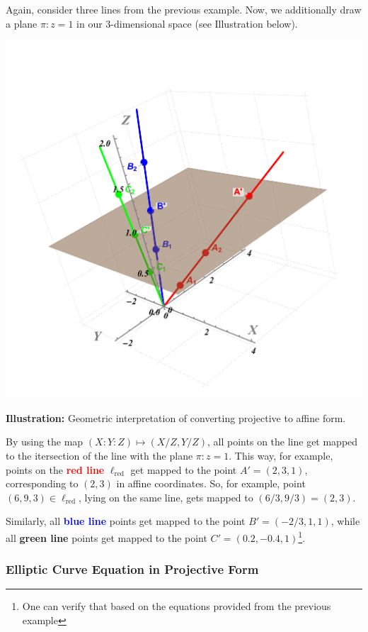 \documentclass[../lecture-notes-148x210.tex]{subfiles}
\begin{document}
\begin{example}
    Again, consider three lines from the previous example. Now, we additionally draw a plane $\pi: z=1$ in our 3-dimensional space (see Illustration below).

    \begin{center}
        \includegraphics[trim={100 100 100 200}, width=0.45\linewidth, clip]{images/lecture_4/line_2.pdf}
        
        \small{\textbf{Illustration:} Geometric interpretation of converting projective to affine form.}
    \end{center}

    By using the map $(X:Y:Z) \mapsto (X/Z,Y/Z)$, all points on the line get mapped to the itersection of the line with the plane $\pi: z=1$. This way, for example, points on the \textcolor{red}{\textbf{red line}} $\ell_{\text{red}}$ get mapped to the point $A'=(2,3,1)$, corresponding to $(2,3)$ in affine coordinates. So, for example, point $(6,9,3) \in \ell_{\text{red}}$, lying on the same line, gets mapped to $(6/3,9/3) = (2,3)$.

    Similarly, all \textcolor{blue}{\textbf{blue line}} points get mapped to the point $B'=(-2/3,1,1)$, while all \textcolor{green!60!black}{\textbf{green line}} points get mapped to the point $C'=(0.2,-0.4,1)$\footnote{One can verify that based on the equations provided from the previous example}.
\end{example}

\subsubsection{Elliptic Curve Equation in Projective Form}
\end{document}

